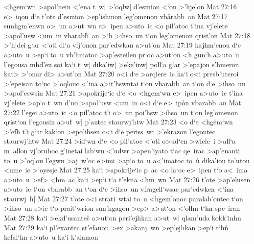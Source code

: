 <hgem`wn
>apol'uein
<'ena
t~w|
>'oqlw|
d'esmion
<`on
>'hjelon\bibvsend
\vs Mat 27:16
e>~iqon
d`e
t'ote
d'esmion
>ep'ishmon
leg'omenon
vb\r{a}rabb~an\bibvsend
{}
\vs Mat 27:17
sunhgm'enwn
o>~un
a>ut~wn
e>~ipen
a>uto~ic
<o
pil'atoc
t'ina
vj'elete
>apol'usw
<um~in
vbarab\r{b}~an
>`h
>ihso~un
t`on
leg'omenon
qrist'on\bibvsend
\vs Mat 27:18
>'h|dei
g`ar
<'oti
di`a
vfj'onon
par'edwkan
a>ut'on\bibvsend
\vs Mat 27:19
kajhm'enou
d`e
a>uto~u
>ep`i
to~u
vb'hmatoc
>ap'esteilen
pr`oc
a>ut`on
<h
gun`h
a>uto~u
l'egousa
mhd'en
soi
ka`i
t~w|
dika'iw|
>eke'inw|
poll`a
g`ar
>'epajon
s'hmeron
kat>
>'onar
di>
a>ut'on\bibvsend
\vs Mat 27:20
o<i
d`e
>arqiere~ic
ka`i
o<i
presb'uteroi
>'epeisan
to`uc
>'oqlouc
<'ina
a>it'hswntai
t`on
vbarabb~an
t`on
d`e
>ihso~un
>apol'eswsin\bibvsend
\vs Mat 27:21
>apokrije`ic
d`e
<o
<hgem`wn
e>~ipen
a>uto~ic
t'ina
vj'elete
>ap`o
t~wn
d'uo
>apol'usw
<um~in
o<i
d`e
e>~ip\r{o}n
vbarabb~an\bibvsend
\vs Mat 27:22
l'egei
a>uto~ic
<o
pil'atoc
t'i
o>~un
poi'hsw
>ihso~un
t`on
leg'omenon
qrist`on
l'egousin
a>u\r{t}~w|
p'antec
staurwj'htw\bibvsend
\vs Mat 27:23
<o
d`e
<hg\r{e}m`wn
>'efh
t'i
g`ar
kak`on
>epo'ihsen
o<i
d`e
periss~wc
>'ekrazon
l'egontec
staurwj'htw\bibvsend
\vs Mat 27:24
>id`wn
d`e
<o
pil'atoc
<'oti
o>ud`en
>wfele~i
>all`a
m~allon
vj'oruboc
g'inetai
lab`wn
<'udwr
>apen'iyato
t`ac
qe~irac
>ap'enanti
to~u
>'oqlou
l'egwn
>aj~w'oc
e>imi
>ap`o
to~u
a<'imatoc
to~u\r{}
dika'iou
to'utou
<ume~ic
>'oyesje\bibvsend
\vs Mat 27:25
ka`i
>apokrije`ic
p~ac
<o
la`oc
e>~ipen
t`o
a<~ima
a>uto~u
>ef>
<hm~ac
ka`i
>ep`i
t`a
t'ekna
<hm~wn\bibvsend
\vs Mat 27:26
t'ote
>ap'elusen
a>uto~ic
t`on
vbarabb~an
t`on
d`e
>ihso~un
vfragell'wsac
par'edwken
<'ina
staurwj~h|\bibvsend
\vs Mat 27:27
t'ote
o<i
strati~wtai
to~u
<hgem'onoc
paralab'ontec
t`on
>ihso~un
e>ic
t`o
prait'wrion
sun'hgagon
>ep>
a>ut`on
<'olhn
t`hn
spe~iran\bibvsend
\vs Mat 27:28
ka`i
>ekd'usantec\r{}
a>ut`on
peri'ejhkan
a>ut~w|
qlam'uda
kokk'inhn\bibvsend
\vs Mat 27:29
ka`i
pl'exantec
st'efanon
>ex
>akanj~wn
>ep'ejhkan
>ep`i
t`hn\r{}
kefal`hn
a>uto~u
ka`i
k'alamon
